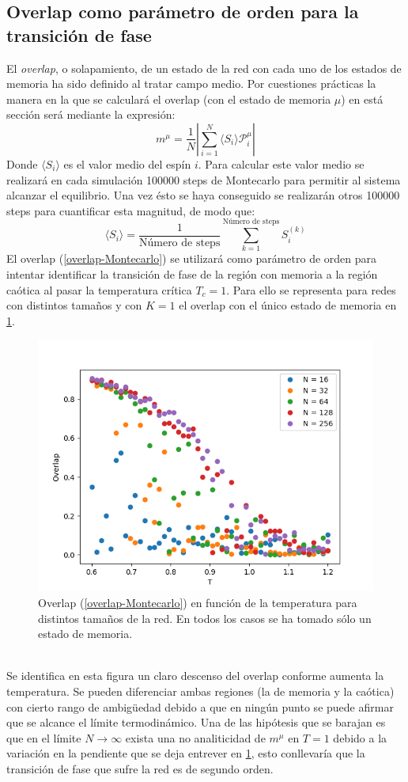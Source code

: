 \documentclass[titlepage,12pt]{article}
\numberwithin{equation}{section}
\begin{document}
	\subsection{Overlap como parámetro de orden para la transición de fase}
	El \textit{overlap}, o solapamiento, de un estado de la red con cada uno de los estados de memoria ha sido definido al tratar campo medio. Por cuestiones prácticas la manera en la que se calculará el overlap (con el estado de memoria $\mu$) en está sección será mediante la expresión:
	\begin{equation}
	    m^{\mu} = \frac{1}{N} \left| \sum_{i=1}^{N} \langle S_{i} \rangle \mathcal{P}^{\mu}_{i}  \right|
	    \label{overlap-Montecarlo}
	\end{equation}
	Donde $\langle S_{i} \rangle$ es el valor medio del espín $i$. Para calcular este valor medio se realizará en cada simulación 100000 steps de Montecarlo para permitir al sistema alcanzar el equilibrio. Una vez ésto se haya conseguido se realizarán otros 100000 steps para cuantificar esta magnitud, de modo que:
	\begin{equation}
	    \langle S_{i} \rangle = \frac{1}{\text{Número de steps}} \sum_{k=1}^{\text{Número de steps}} S_{i}^{(k)}
	\end{equation}
	El overlap (\ref{overlap-Montecarlo}) se utilizará como parámetro de orden para intentar identificar la transición de fase de la región con memoria a la región caótica al pasar la temperatura crítica $T_{c} = 1$. Para ello se representa para redes con distintos tamaños y con $K = 1$ el overlap con el único estado de memoria en \ref{FSS-Overlap}.
	\begin{figure}
	    \centering
	    \includegraphics[width=.45\linewidth]{Overlap_FSS.png}
	    \caption{Overlap (\ref{overlap-Montecarlo}) en función de la temperatura para distintos tamaños de la red. En todos los casos se ha tomado sólo un estado de memoria.}
	    \label{FSS-Overlap}
	\end{figure}
	\\
	Se identifica en esta figura un claro descenso del overlap conforme aumenta la temperatura. Se pueden diferenciar ambas regiones (la de memoria y la caótica) con cierto rango de ambigüedad debido a que en ningún punto se puede afirmar que se alcance el límite termodinámico. Una de las hipótesis que se barajan es que en el límite $N \to \infty$ exista una no analiticidad de $m^{\mu}$ en $T = 1$ debido a la variación en la pendiente que se deja entrever en \ref{FSS-Overlap}, esto conllevaría que la transición de fase que sufre la red es de segundo orden.
\end{document}

